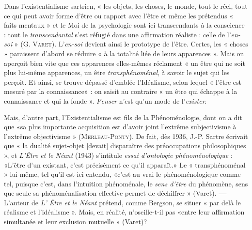Dans l’existentialisme sartrien, « les objets, les choses, le monde, tout le
réel, tout ce qui peut avoir forme d’être ou rapport avec l'être et même les
prétendus « faits mentaux » et le Moi de la psychologie sont ici transcendants
à la conscience : tout le {\it transcendantal} s’est réfugié dans une affirmation
réaliste : celle de l'{\it en-soi} » (G. \textsc{Varet}). L'{\it en-soi} devient ainsi le
prototype de l'être. Certes, les « choses » paraissent d’abord se réduire « à la
totalité liée de leurs apparences ». Mais on aperçoit bien vite que ces apparences
elles-mêmes réclament « un être qui ne soit plus lui-même apparences,
un être {\it transphénoménal}, à savoir le sujet qui les perçoit. Et ainsi, se trouve
dépassé d'emblée l’Idéalisme, selon lequel « l'être est mesuré par la connaissance» :
on saisit au contraire « un être qui échappe à la connaissance et qui
la fonde ». {\it Penser} n’est qu’un mode de l'{\it exister}.

Mais, d’autre part, l’Existentialisme est fils de la Phénoménologie,
dont on a dit que «sa plus importante acquisition est d’avoir joint
l'extrême subjectivisme à l'extrême objectivisme » (\textsc{Merleau-Ponty}).
De fait, dès 1936, J.-P. Sartre écrivait que « la dualité sujet-objet
[devait] disparaître des préoccupations philosophiques », et {\it L'Être
et le Néant} (1943) s’intitule {\it essai d’ontologie phénoménologique} :
«L'être d’un existant, c’est précisément ce qu’il apparaît.» Le
« transphénoménal » lui-même, tel qu’il est ici entendu, «c’est au
vrai le phénoménologique comme tel, puisque c’est, dans l'intuition
phénoménale, le {\it sens d’être} du phénomène, sens que seule sa phénoménalisation
 effective permet de déchiffrer » (Varet). {\bf —} L'auteur de
{\it L’ Être et le Néant} prétend, comme Bergson, se situer « par delà le réalisme et
l’idéalisme ». Mais, en réalité, n’oscille-t-il pas «entre leur
affirmation simultanée et leur exclusion mutuelle » (Varet)?

